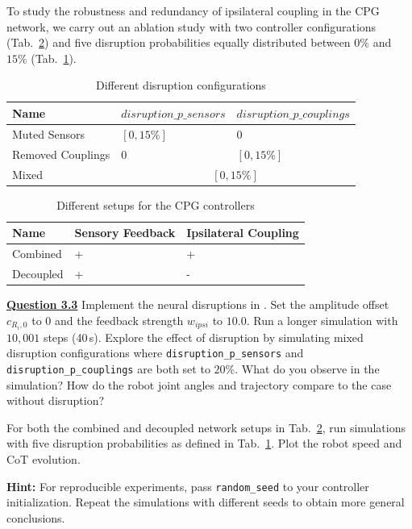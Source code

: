 \documentclass{cmc}
\begin{document}
To study the robustness and redundancy of ipsilateral coupling in the CPG network, we carry out an ablation study with two controller configurations (Tab.~\ref{tab:disruption}) and five disruption probabilities equally distributed between $0\%$ and $15\%$ (Tab.~\ref{tab:disruption_config}).

\begin{table}[!ht]
\centering
\begin{tabular}{|l|l|l|}
    \hline
    Name & $disruption\_p\_sensors$ & $disruption\_p\_couplings$ \\
    \hline
    Muted Sensors & $[0,15\%]$ & $0$ \\
    \hline
    Removed Couplings & $0$ & $[0,15\%]$ \\
    \hline
    Mixed & \multicolumn{2}{c|}{$[0,15\%]$} \\
    \hline
\end{tabular}
\caption{\label{tab:disruption_config} Different disruption configurations}
\end{table}

\begin{table}[!ht]
\centering
\begin{tabular}{|l|l|l|}
    \hline
    Name & Sensory Feedback & Ipsilateral Coupling \\
    \hline
    Combined & + & + \\
    \hline
    Decoupled & + & - \\
    \hline
\end{tabular}
\caption{\label{tab:disruption} Different setups for the CPG controllers}
\end{table}




\textbf{\underline{Question 3.3}} Implement the neural disruptions in . Set the amplitude offset $c_{R_i,0}$ to $0$ and the feedback strength $w_{ipsi}$ to $10.0$. Run a longer simulation with $10{,}001$ steps (40\,s).
Explore the effect of disruption by simulating mixed disruption
configurations where \nolinkurl{disruption_p_sensors} and
\nolinkurl{disruption_p_couplings} are both set to $20\%$. What do you
observe in the simulation? How do the robot joint angles and trajectory
compare to the case without disruption?

For both the combined and decoupled network setups in Tab.~\ref{tab:disruption}, run simulations with five disruption probabilities as defined in Tab.~\ref{tab:disruption_config}. Plot the robot speed and CoT evolution.

\textbf{Hint:} For reproducible experiments, pass \texttt{random\_seed} to your controller initialization. Repeat the simulations with different seeds to obtain more general conclusions.






\label{sec:references}
\end{document}
